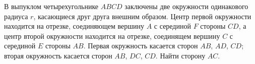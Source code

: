 \documentclass[preview]{standalone}
\begin{document}
\centering В выпуклом четырехугольнике $ABCD$ заключены две окружности одинакового радиуса $r$, 
                          касающиеся друг друга внешним образом. Центр первой окружности находится на отрезке, 
                          соединяющем вершину $A$ с серединой $F$ стороны $CD$, а центр второй окружности находится 
                          на отрезке, соединящем вершину $C$ с серединой $E$ стороны $AB$. Первая окружность касается 
                          сторон $AB$, $AD$, $CD$; вторая окружность касается сторон $AB$, $DC$, $CD$. Найти сторону $AC$.
\end{document}
